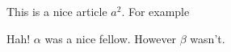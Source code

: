 \documentclass{article}
\begin{document}
This is a nice article $a^2$. For example \cite{ah:affinetvar} 

Hah! $\alpha$ was a nice fellow. However $\beta$ wasn't.



\printindex
\end{document}

